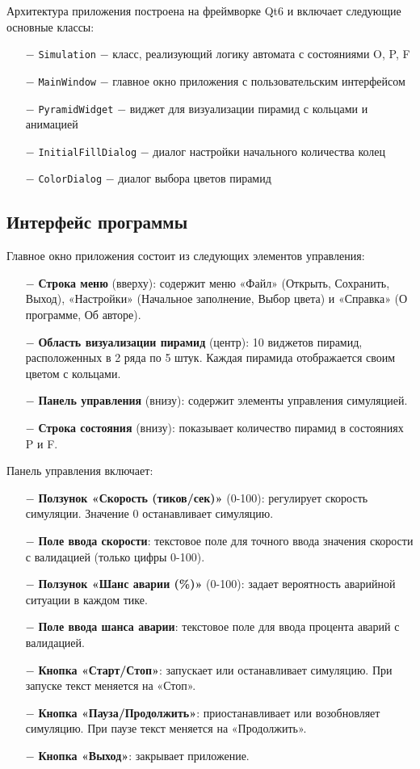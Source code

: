 \documentclass[oneside,a4paper,14pt]{extarticle}
\begin{document}
Архитектура приложения построена на фреймворке Qt6 и включает следующие основные классы:
\begin{itemize}
  \item[$-$] \texttt{Simulation} $-$ класс, реализующий логику автомата с состояниями O, P, F
  \item[$-$] \texttt{MainWindow} $-$ главное окно приложения с пользовательским интерфейсом
  \item[$-$] \texttt{PyramidWidget} $-$ виджет для визуализации пирамид с кольцами и анимацией
  \item[$-$] \texttt{InitialFillDialog} $-$ диалог настройки начального количества колец
  \item[$-$] \texttt{ColorDialog} $-$ диалог выбора цветов пирамид
\end{itemize}

\subsection*{Интерфейс программы}

Главное окно приложения состоит из следующих элементов управления:

\begin{itemize}
  \item[$-$] \textbf{Строка меню} (вверху): содержит меню «Файл» (Открыть, Сохранить, Выход), «Настройки» (Начальное заполнение, Выбор цвета) и «Справка» (О программе, Об авторе).
  \item[$-$] \textbf{Область визуализации пирамид} (центр): 10 виджетов пирамид, расположенных в 2 ряда по 5 штук. Каждая пирамида отображается своим цветом с кольцами.
  \item[$-$] \textbf{Панель управления} (внизу): содержит элементы управления симуляцией.
  \item[$-$] \textbf{Строка состояния} (внизу): показывает количество пирамид в состояниях P и F.
\end{itemize}

Панель управления включает:
\begin{itemize}
  \item[$-$] \textbf{Ползунок «Скорость (тиков/сек)»} (0-100): регулирует скорость симуляции. Значение 0 останавливает симуляцию.
  \item[$-$] \textbf{Поле ввода скорости}: текстовое поле для точного ввода значения скорости с валидацией (только цифры 0-100).
  \item[$-$] \textbf{Ползунок «Шанс аварии (\%)»} (0-100): задает вероятность аварийной ситуации в каждом тике.
  \item[$-$] \textbf{Поле ввода шанса аварии}: текстовое поле для ввода процента аварий с валидацией.
  \item[$-$] \textbf{Кнопка «Старт/Стоп»}: запускает или останавливает симуляцию. При запуске текст меняется на «Стоп».
  \item[$-$] \textbf{Кнопка «Пауза/Продолжить»}: приостанавливает или возобновляет симуляцию. При паузе текст меняется на «Продолжить».
  \item[$-$] \textbf{Кнопка «Выход»}: закрывает приложение.
\end{itemize}
\end{document}
